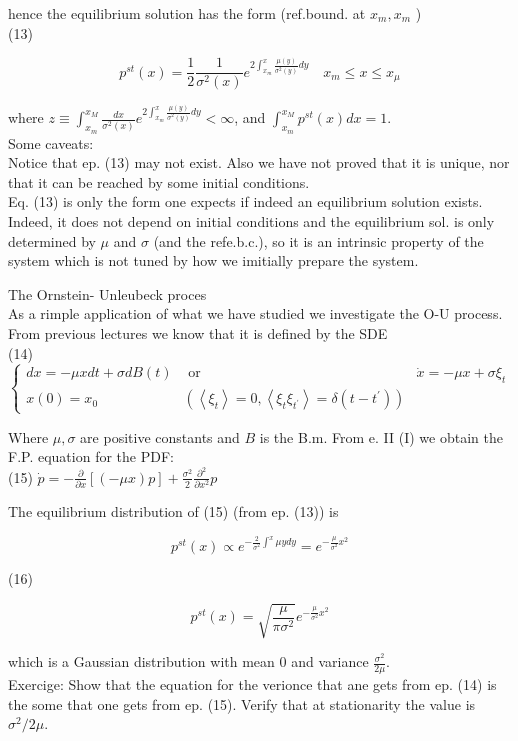\documentclass[10pt]{article}
\begin{document}
hence the equilibrium solution has the form (ref.bound. at $x_{m}, x_{m}$ )\\
(13)

$$
p^{s t}(x)=\frac{1}{2} \frac{1}{\sigma^{2}(x)} e^{2 \int_{x_{m}}^{x} \frac{\mu(y)}{\sigma^{2}(y)} d y} \quad x_{m} \leq x \leq x_{\mu}
$$

where $z \equiv \int_{x_{m}}^{x_{M}} \frac{d x}{\sigma^{2}(x)} e^{2 \int_{x_{m}}^{x} \frac{\mu(y)}{\sigma^{2}(y)} d y}<\infty$, and $\int_{x_{m}}^{x_{M}} p^{s t}(x) d x=1$.\\
Some caveats:\\
Notice that ep. (13) may not exist. Also we have not proved that it is unique, nor that it can be reached by some initial conditions.\\
Eq. (13) is only the form one expects if indeed an equilibrium solution exists. Indeed, it does not depend on initial conditions and the equilibrium sol. is only determined by $\mu$ and $\sigma$ (and the refe.b.c.), so it is an intrinsic property of the system which is not tuned by how we imitially prepare the system.

The Ornstein- Unleubeck proces\\
As a rimple application of what we have studied we investigate the O-U process. From previous lectures we know that it is defined by the SDE\\
(14) $\left\{\begin{array}{lll}d x=-\mu x d t+\sigma d B(t) & \text { or } & \dot{x}=-\mu x+\sigma \xi_{t} \\ x(0)=x_{0} & \left(\left\langle\xi_{t}\right\rangle=0,\left\langle\xi_{t} \xi_{t^{\prime}}\right\rangle=\delta\left(t-t^{\prime}\right)\right)\end{array}\right.$

Where $\mu, \sigma$ are positive constants and $B$ is the B.m. From e. II (I) we obtain the F.P. equation for the PDF:\\
(15) $\dot{p}=-\frac{\partial}{\partial x}[(-\mu x) p]+\frac{\sigma^{2}}{2} \frac{\partial^{2}}{\partial x^{2}} p$

The equilibrium distribution of (15) (from ep. (13)) is

$$
p^{s t}(x) \propto e^{-\frac{2}{\sigma^{2}} \int^{x} \mu y d y}=e^{-\frac{\mu}{\sigma^{2}} x^{2}}
$$

(16)

$$
p^{s t}(x)=\sqrt{\frac{\mu}{\pi \sigma^{2}}} e^{-\frac{\mu}{\sigma^{2}} x^{2}}
$$

which is a Gaussian distribution with mean 0 and variance $\frac{\sigma^{2}}{2 \mu}$.\\
Exercige: Show that the equation for the verionce that ane gets from ep. (14) is the some that one gets from ep. (15). Verify that at stationarity the value is $\sigma^{2} / 2 \mu$.
\end{document}
